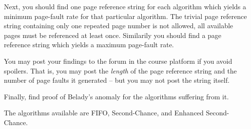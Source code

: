\documentclass[a4paper,nocourse]{miunasgn}
\begin{document}
Next, you should find one page reference string for each algorithm which yields 
a minimum page-fault rate for that particular algorithm.
The trivial page reference string containing only one repeated page number is 
not allowed, all available pages must be referenced at least once.
Similarily you should find a page reference string which yields a maximum 
page-fault rate.

You may post your findings to the forum in the course platform if you avoid 
spoilers.
That is, you may post the \emph{length} of the page reference string and the 
number of page faults it generated -- but you may not post the string itself.

Finally, find proof of Belady's anomaly for the algorithms suffering from it.

The algorithms available are FIFO, Second-Chance, and Enhanced Second-Chance.
\end{document}
